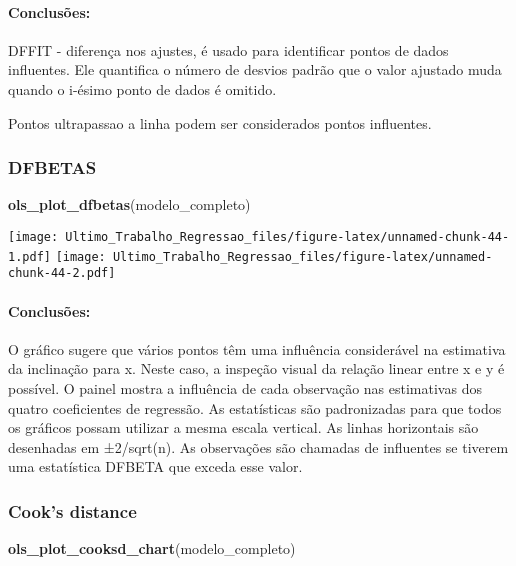 \documentclass[
]{article}
\newenvironment{Shaded}{\begin{snugshade}}{\end{snugshade}}
\newcommand{\FunctionTok}[1]{\textcolor[rgb]{0.13,0.29,0.53}{\textbf{#1}}}
\newcommand{\NormalTok}[1]{#1}
\begin{document}
\hypertarget{conclusuxf5es-5}{%
\paragraph{Conclusões:}\label{conclusuxf5es-5}}

DFFIT - diferença nos ajustes, é usado para identificar pontos de dados
influentes. Ele quantifica o número de desvios padrão que o valor
ajustado muda quando o i-ésimo ponto de dados é omitido.

Pontos ultrapassao a linha podem ser considerados pontos influentes.

\hypertarget{dfbetas}{%
\subsubsection{DFBETAS}\label{dfbetas}}

\begin{Shaded}
\begin{Highlighting}[]
\FunctionTok{ols\_plot\_dfbetas}\NormalTok{(modelo\_completo)}
\end{Highlighting}
\end{Shaded}

\texttt{[image: Ultimo\_Trabalho\_Regressao\_files/figure-latex/unnamed-chunk-44-1.pdf]}
\texttt{[image: Ultimo\_Trabalho\_Regressao\_files/figure-latex/unnamed-chunk-44-2.pdf]}

\hypertarget{conclusuxf5es-6}{%
\paragraph{Conclusões:}\label{conclusuxf5es-6}}

O gráfico sugere que vários pontos têm uma influência considerável na
estimativa da inclinação para x. Neste caso, a inspeção visual da
relação linear entre x e y é possível. O painel mostra a influência de
cada observação nas estimativas dos quatro coeficientes de regressão. As
estatísticas são padronizadas para que todos os gráficos possam utilizar
a mesma escala vertical. As linhas horizontais são desenhadas em
±2/sqrt(n). As observações são chamadas de influentes se tiverem uma
estatística DFBETA que exceda esse valor.

\hypertarget{cooks-distance}{%
\subsubsection{Cook's distance}\label{cooks-distance}}

\begin{Shaded}
\begin{Highlighting}[]
\FunctionTok{ols\_plot\_cooksd\_chart}\NormalTok{(modelo\_completo)}
\end{Highlighting}
\end{Shaded}
\end{document}
